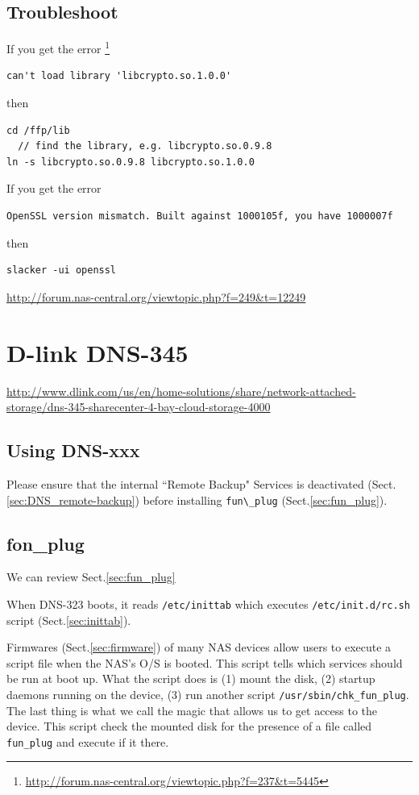 \subsection{Troubleshoot}

If you get the error
\footnote{\url{http://forum.nas-central.org/viewtopic.php?f=237&t=5445}}
\begin{verbatim}
can't load library 'libcrypto.so.1.0.0'
\end{verbatim}
then 
\begin{verbatim}
cd /ffp/lib 
  // find the library, e.g. libcrypto.so.0.9.8
ln -s libcrypto.so.0.9.8 libcrypto.so.1.0.0

\end{verbatim}

If you get the error
\begin{verbatim}
OpenSSL version mismatch. Built against 1000105f, you have 1000007f
\end{verbatim}
then 
\begin{verbatim}
slacker -ui openssl
\end{verbatim}
\url{http://forum.nas-central.org/viewtopic.php?f=249&t=12249}

\section{D-link DNS-345}

\url{http://www.dlink.com/us/en/home-solutions/share/network-attached-storage/dns-345-sharecenter-4-bay-cloud-storage-4000}

\subsection{Using DNS-xxx}

Please ensure that the internal ``Remote Backup" Services is deactivated
(Sect.\ref{sec:DNS_remote-backup}) before installing \verb!fun\_plug!
(Sect.\ref{sec:fun_plug}).

\subsection{fon\_plug}

We can review Sect.\ref{sec:fun_plug}

When DNS-323 boots, it reads \verb!/etc/inittab! which executes
\verb!/etc/init.d/rc.sh! script (Sect.\ref{sec:inittab}).

Firmwares (Sect.\ref{sec:firmware}) of many NAS devices allow users to execute a
script file when the NAS's O/S is booted. This script tells which services
should be run at boot up.
What the script does is (1) mount the disk, (2) startup daemons running on the
device, (3) run another script \verb!/usr/sbin/chk_fun_plug!. The last thing is
what we call the magic that allows us to get access to the device. This script
check the mounted disk for the presence of a file called \verb!fun_plug! and
execute if it there.


